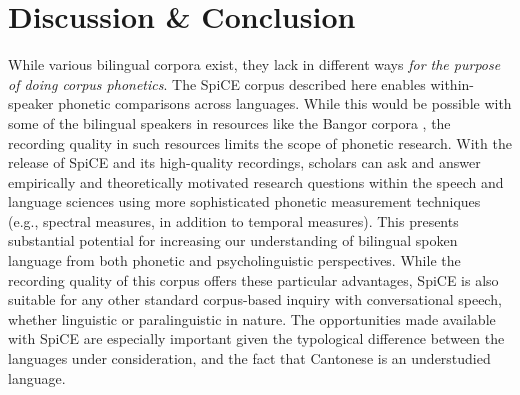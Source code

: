 \section{Discussion \& Conclusion}\label{ch2:subsec:discussion}

While various bilingual corpora exist, they lack in different ways \textit{for the purpose of doing corpus phonetics}. The SpiCE corpus described here enables within-speaker phonetic comparisons across languages. While this would be possible with some of the bilingual speakers in resources like the Bangor corpora \citep{deuchar_2014_corpora}, the recording quality in such resources limits the scope of phonetic research. With the release of SpiCE and its high-quality recordings, scholars can ask and answer empirically and theoretically motivated research questions within the speech and language sciences using more sophisticated phonetic measurement techniques (e.g., spectral measures, in addition to temporal measures). This presents substantial potential for increasing our understanding of bilingual spoken language from both phonetic and psycholinguistic perspectives. While the recording quality of this corpus offers these particular advantages, SpiCE is also suitable for any other standard corpus-based inquiry with conversational speech, whether linguistic or paralinguistic in nature. The opportunities made available with SpiCE are especially important given the typological difference between the languages under consideration, and the fact that Cantonese is an understudied language. 

\endinput %
